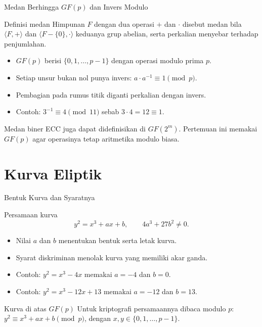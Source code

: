 \documentclass[aspectratio=169,11pt]{beamer}
\begin{document}
\begin{frame}{Medan Berhingga $GF(p)$ dan Invers Modulo}
    \begin{block}{Definisi medan}
        \footnotesize
        Himpunan $F$ dengan dua operasi $+$ dan $\cdot$ disebut medan bila
        $\langle F,+ \rangle$ dan $\langle F-\{0\},\cdot \rangle$ keduanya
        grup abelian, serta perkalian menyebar terhadap penjumlahan.
    \end{block}
    \vspace{0.05cm}
    \begin{itemize}
        \item $GF(p)$ berisi $\{0,1,\dots,p-1\}$ dengan operasi modulo prima
              $p$.
        \item Setiap unsur bukan nol punya invers:
              $a \cdot a^{-1} \equiv 1 \pmod p$.
        \item Pembagian pada rumus titik diganti perkalian dengan invers.
        \item Contoh: $3^{-1} \equiv 4 \pmod{11}$ sebab
              $3 \cdot 4 = 12 \equiv 1$.
    \end{itemize}
    \begin{alertblock}{Medan biner}
        \footnotesize
        ECC juga dapat didefinisikan di $GF(2^m)$. Pertemuan ini memakai
        $GF(p)$ agar operasinya tetap aritmetika modulo biasa.
    \end{alertblock}
\end{frame}

\section{Kurva Eliptik}

\begin{frame}{Bentuk Kurva dan Syaratnya}
    \begin{block}{Persamaan kurva}
        \[
            y^2 = x^3 + ax + b,
            \qquad 4a^3 + 27b^2 \neq 0 .
        \]
    \end{block}
    \vspace{0.05cm}
    \begin{itemize}
        \item Nilai $a$ dan $b$ menentukan bentuk serta letak kurva.
        \item Syarat diskriminan menolak kurva yang memiliki akar ganda.
        \item Contoh: $y^2 = x^3 - 4x$ memakai $a=-4$ dan $b=0$.
        \item Contoh: $y^2 = x^3 - 12x + 13$ memakai $a=-12$ dan $b=13$.
    \end{itemize}
    \begin{alertblock}{Kurva di atas $GF(p)$}
        \footnotesize
        Untuk kriptografi persamaannya dibaca modulo $p$:
        $y^2 \equiv x^3 + ax + b \pmod p$, dengan
        $x,y \in \{0,1,\dots,p-1\}$.
    \end{alertblock}
\end{frame}
\end{document}
